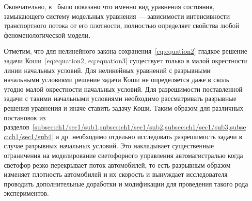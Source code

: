 Окончательно, в~\cite{collectiveArticle} было показано что именно вид уравнения состояния, замыкающего систему модельных уравнения --- зависимости интенсивности транспортного потока от его плотности, полностью определяет свойства любой феноменологической модели.

Отметим, что для нелинейного закона сохранения~\ref{eq:equation2} гладкое решение задачи Коши~\ref{eq:equation2, eq:equation3} существует только в малой окрестности линии начальных условий. Для нелинейных уравнений с разрывными начальными условиями решение задачи Коши не определяется даже в сколь угодно малой окрестности начальных условий.
Для разрешимости поставленной задачи с такими начальными условиями необходимо рассматривать разрывные решения уравнения и иначе ставить задачу Коши.
Таким образом для различных постановок из разделов~\ref{subsec:ch1/sec1/sub1,subsec:ch1/sec1/sub2,subsec:ch1/sec1/sub3,subsec:ch1/sec1/sub4} и др. необходимо отдельно исследовать разрешимость задачи в случае разрывных начальных условий.
Это накладывает существенные ограничения на моделирование светофорного управления автомагистралью когда светофор резко перекрывает поток автомобилей, то есть разрывным образом изменяет плотность автомобилей и их скорость и вынуждает исследователя проводить дополнительные доработки и модификации для проведения такого рода экспериментов.


\FloatBarrier